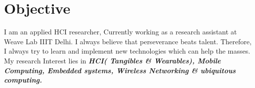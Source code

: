 \documentclass[10pt]{report}
\begin{document}
\section*{\color{BlueViolet}\faLightbulbO\hspace{1pt} Objective}%
\vspace{-1em}\normalfont I am an applied HCI researcher, Currently working as a research assistant at Weave Lab IIIT Delhi. I always believe that perseverance beats talent. Therefore, I always try to learn and implement new technologies which can help the masses. My research Interest lies in\textbf{\emph{ HCI( Tangibles \& Wearables), Mobile Computing, Embedded systems, Wireless Networking \& ubiquitous computing.}}\vspace{-1em}




\end{document}
